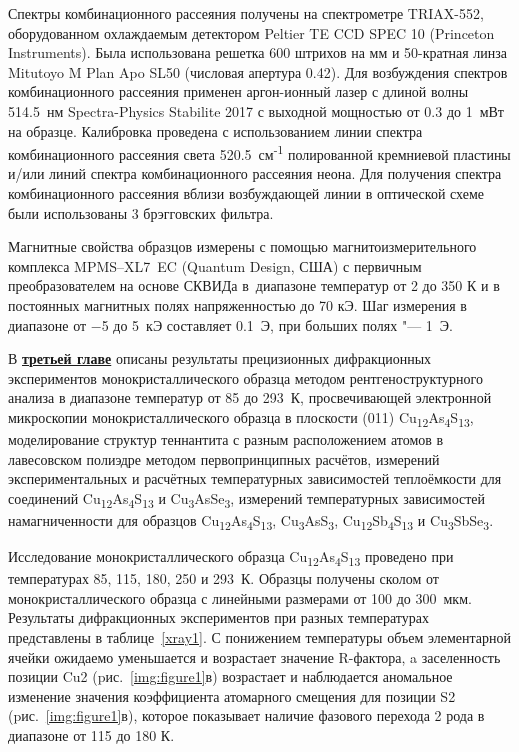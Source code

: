 Спектры комбинационного рассеяния получены на спектрометре TRIAX-552, оборудованном охлаждаемым детектором Peltier TE CCD SPEC 10 (Princeton Instruments).
Была использована решетка 600 штрихов на мм и 50-кратная линза Mitutoyo M Plan Apo SL50 (числовая апертура 0.42).
Для возбуждения спектров комбинационного рассеяния применен аргон-ионный лазер с длиной волны 514.5~нм Spectra-Physics Stabilite 2017 с выходной мощностью от 0.3 до 1~мВт на образце. Калибровка проведена с использованием линии спектра комбинационного рассеяния света 520.5~см\textsuperscript{-1} полированной кремниевой пластины и/или линий спектра комбинационного рассеяния неона.
Для получения спектра комбинационного рассеяния вблизи возбуждающей линии в оптической схеме были использованы 3  брэгговских фильтра.

Магнитные свойства образцов измерены с
помощью магнитоизмерительного комплекса
MPMS--XL7~EC (Quantum Design, США) с первичным преобразователем на основе СКВИДа в~диапазоне температур от 2 до 350 К и в постоянных магнитных полях напряженностью до 70 кЭ. Шаг измерения в диапазоне от $-$5 до 5~кЭ составляет 0.1~Э, при больших полях "--- 1~Э.

В \underline{\textbf{третьей главе}} описаны результаты прецизионных дифракционных экспериментов монокристаллического образца методом рентгеноструктурного анализа в диапазоне температур от 85 до 293~К, просвечивающей электронной микроскопии монокристаллического образца в плоскости (011) Cu\textsubscript{12}As\textsubscript{4}S\textsubscript{13},
моделирование структур теннантита с разным расположением атомов в лавесовском полиэдре методом первопринципных расчётов,
измерений экспериментальных и расчётных температурных зависимостей теплоёмкости для соединений Cu\textsubscript{12}As\textsubscript{4}S\textsubscript{13} и Cu\textsubscript{3}AsSe\textsubscript{3},
измерений температурных зависимостей намагниченности для образцов Cu\textsubscript{12}As\textsubscript{4}S\textsubscript{13}, Cu\textsubscript{3}AsS\textsubscript{3}, Cu\textsubscript{12}Sb\textsubscript{4}S\textsubscript{13} и Cu\textsubscript{3}SbSe\textsubscript{3}.



Исследование монокристаллического образца  Cu\textsubscript{12}As\textsubscript{4}S\textsubscript{13} проведено при температурах 85, 115, 180, 250 и 293~К. Образцы получены сколом от монокристаллического образца с линейными размерами от 100 до 300~мкм.  Результаты дифракционных экспериментов при разных температурах представлены в таблице~\ref{xray1}. С понижением температуры объем элементарной ячейки ожидаемо уменьшается и возрастает значение R-фактора, a  заселенность позиции Cu2 (pис.~\ref{img:figure1}в) возрастает и  наблюдается аномальное изменение значения коэффициента атомарного смещения для позиции S2 (pис.~\ref{img:figure1}в), которое показывает наличие фазового перехода 2 рода в диапазоне от 115 до 180 К.

